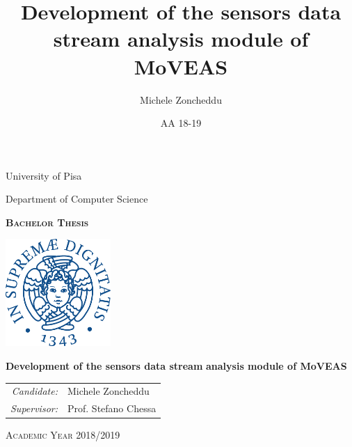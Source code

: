 \documentclass[a4paper, 12pt]{report}
\title{Development of the sensors data stream analysis module of MoVEAS}
\author{Michele Zoncheddu}
\date{AA 18-19}
\begin{document}
	\begin{titlepage}
		
		\begin{center}

		{\Large University of Pisa}
		\medskip

		{\Large Department of Computer Science}

		\vspace{20mm}

		{\bfseries\Large \textsc{Bachelor Thesis}}

		\vfill

		\centerline{\mbox{\includegraphics[width=4cm]{img/university_logos/cherubino_unipi.pdf}}}

		\vfill

		{\LARGE\bfseries Development of the sensors data stream}
		\medbreak
		{\LARGE\bfseries analysis module of MoVEAS}

		\vfill

		\large
		\begin{tabular}{rl}
			\textit{Candidate:} & Michele Zoncheddu\\
			\noalign{\vspace{2mm}}
			\textit{Supervisor:} & Prof. Stefano Chessa\\
		\end{tabular}
		
		\vspace{20mm}

		\vfill

		{\large \textsc{Academic Year 2018/2019}}
	\end{center}

	\end{titlepage}


	\tableofcontents
	\clearpage

	\sloppy

	
	\clearpage
	
	\clearpage
	
	\clearpage
	
	\clearpage
	
	\clearpage
	

	\printbibliography[nottype=online, title=Bibliography]
	\printbibliography[type=online, title=Sitography]
\end{document}
